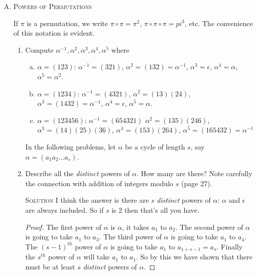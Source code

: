 \documentclass[twoside]{amsart}
\newcommand{\solution}{\textsc{Solution}\xspace}
\newcommand{\eps}{\ensuremath{\epsilon}\xspace}
\begin{document}
\begin{enumerate}[A.]
   \item \textsc{Powers of Permutations}

   \noindent If $\pi$ is a permutation, we write $\pi \circ \pi = \pi^2$,
   $\pi \circ \pi \circ \pi = pi^3$, etc. The convenience of this notation
   is evident.

   \begin{enumerate}[1]
      \item Compute $\alpha^{-1}, \alpha^2, \alpha^3, \alpha^4, \alpha^5$
      where
      \begin{enumerate}[(a)]
         \item $\alpha=(123)$: $\alpha^{-1}=(321)$, $\alpha^2=(132)=
	 \alpha^{-1}$,
	 $\alpha^3=\eps$, $\alpha^4=\alpha$, $\alpha^5=\alpha^2$.

	 \item $\alpha=(1234)$: $\alpha^{-1}=(4321)$, $\alpha^2=(13)(24)$,
	 $\alpha^3=(1432)=\alpha^{-1}$, $\alpha^4=\eps$, $\alpha^5=\alpha$.

	 \item $\alpha=(123456)$: $\alpha^{-1}=(654321)$ 
	 $\alpha^2=(135)(246)$, $\alpha^3=(14)(25)(36)$, $\alpha^4=
	 (153)(264)$, $\alpha^5=(165432)=\alpha^{-1}$
      \end{enumerate}

      \vspace{5pt}
      \noindent In the following problems, let $\alpha$ be a cycle
      of length $s$, say $\alpha = (a_1a_2\dots a_s)$.
      \vspace{5pt}

      \item Describe all the \emph{distinct} powers of $\alpha$. How
      many are there? Note carefully the connection with addition of
      integers modulo $s$ (page 27).

      \noindent \solution I think the answer is there are $s$ \emph{distinct}
      powers of $\alpha$: $\alpha$ and \eps are always included. So if 
      $s$ is 2 then that's all you have.
      \begin{proof}
      The first power of $\alpha$ is $\alpha$, it takes $a_1$ to $a_2$. 
      The second power of $\alpha$
      is going to take $a_1$ to $a_3$. The third power of $\alpha$ is going
      to take $a_1$ to $a_4$. The $(s-1)^{th}$ power of $\alpha$ is going to
      take $a_1$ to $a_{1+s-1} = a_s$. Finally the $s^{th}$ power of $\alpha$
      will take $a_1$ to $a_1$. So by this we have shown that there must
      be at least $s$ \emph{distinct} powers of $\alpha$.


\end{proof}
\end{enumerate}
\end{enumerate}
\end{document}
